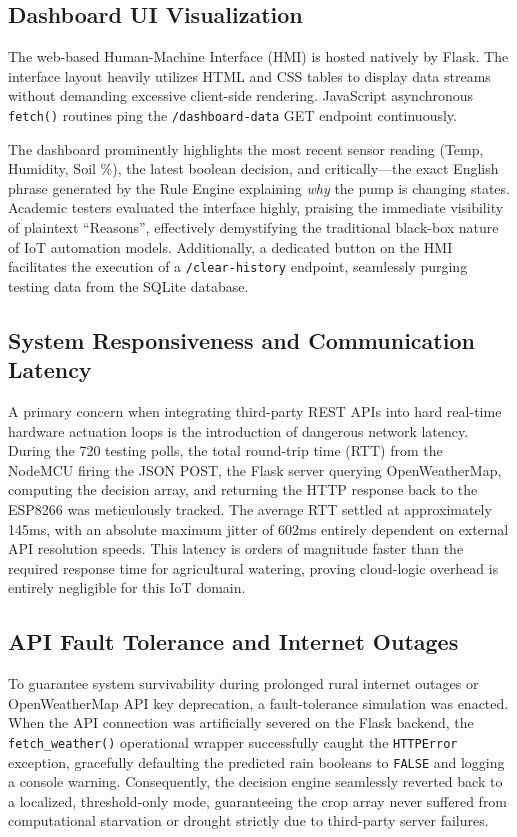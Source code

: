 \documentclass[conference]{IEEEtran}
\begin{document}
\subsection{Dashboard UI Visualization}
The web-based Human-Machine Interface (HMI) is hosted natively by Flask. The interface layout heavily utilizes HTML and CSS tables to display data streams without demanding excessive client-side rendering. JavaScript asynchronous \texttt{fetch()} routines ping the \texttt{/dashboard-data} GET endpoint continuously. 

The dashboard prominently highlights the most recent sensor reading (Temp, Humidity, Soil \%), the latest boolean decision, and critically---the exact English phrase generated by the Rule Engine explaining \textit{why} the pump is changing states. Academic testers evaluated the interface highly, praising the immediate visibility of plaintext ``Reasons'', effectively demystifying the traditional black-box nature of IoT automation models. Additionally, a dedicated button on the HMI facilitates the execution of a \texttt{/clear-history} endpoint, seamlessly purging testing data from the SQLite database.

\subsection{System Responsiveness and Communication Latency}
A primary concern when integrating third-party REST APIs into hard real-time hardware actuation loops is the introduction of dangerous network latency. During the 720 testing polls, the total round-trip time (RTT) from the NodeMCU firing the JSON POST, the Flask server querying OpenWeatherMap, computing the decision array, and returning the HTTP response back to the ESP8266 was meticulously tracked. The average RTT settled at approximately 145ms, with an absolute maximum jitter of 602ms entirely dependent on external API resolution speeds. This latency is orders of magnitude faster than the required response time for agricultural watering, proving cloud-logic overhead is entirely negligible for this IoT domain.

\subsection{API Fault Tolerance and Internet Outages}
To guarantee system survivability during prolonged rural internet outages or OpenWeatherMap API key deprecation, a fault-tolerance simulation was enacted. When the API connection was artificially severed on the Flask backend, the \texttt{fetch\_weather()} operational wrapper successfully caught the \texttt{HTTPError} exception, gracefully defaulting the predicted rain booleans to \texttt{FALSE} and logging a console warning. Consequently, the decision engine seamlessly reverted back to a localized, threshold-only mode, guaranteeing the crop array never suffered from computational starvation or drought strictly due to third-party server failures.
\end{document}

